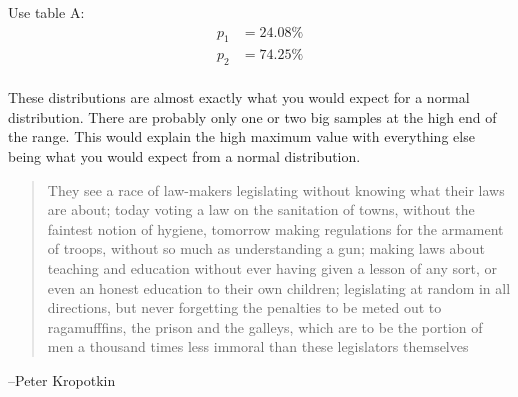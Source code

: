 \documentclass[letterpaper, landscape]{exam}
\begin{document}
\begin{description}
\begin{parts}
          Use table A:\@
          \begin{align*}
            p_1 & = 24.08 \% \\
            p_2 & = 74.25 \% \\
          \end{align*}

          These distributions are almost exactly what you would expect for a
          normal distribution.  There are probably only one or two big samples
          at the high end of the range.  This would explain the high maximum
          value with everything else being what you would expect from a normal
          distribution.

        \end{parts}


    \end{description}

  \else
    \vspace{9 cm}
    \begin{quote}
      \begin{em}
        They see a race of law-makers legislating without knowing what their
        laws are about; today voting a law on the sanitation of towns, without
        the faintest notion of hygiene, tomorrow making regulations for the
        armament of troops, without so much as understanding a gun; making laws
        about teaching and education without ever having given a lesson of any
        sort, or even an honest education to their own children; legislating at
        random in all directions, but never forgetting the penalties to be meted
        out to ragamufffins, the prison and the galleys, which are to be the
        portion of men a thousand times less immoral than these legislators
        themselves
      \end{em}
    \end{quote}
    \hspace{1 cm} --Peter Kropotkin
  \fi
\end{document}
